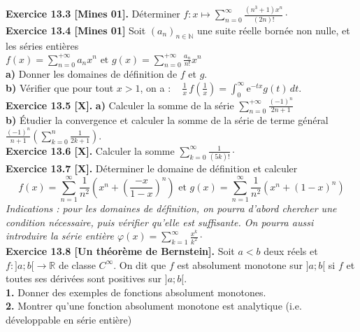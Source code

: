 \documentclass[a4paper,12pt,francais]{article}
\newcommand{\field}[1]{\mathbb{#1}}
\newcommand{\N}{\field{N}}
\newcommand{\R}{\field{R}}
\newcommand{\e}{\mbox{e}}
\begin{document}
\noindent
{\bf Exercice 13.3 [Mines 01].} Déterminer $\displaystyle f: x\mapsto
\sum_{n=0}^\infty \frac{(n^3+1)x^n}{(2n)!} \cdot$\\

\noindent
{\bf Exercice 13.4 [Mines 01]} Soit $(a_n)_{n\in \N}$ une suite réelle
bornée non nulle, et les séries entières \\
$\displaystyle f(x)=\sum_{n=0}^{+\infty} a_n x^n \mbox{ et }
 g(x)=\sum_{n=0}^{+\infty} \frac{a_n}{n!} x^n$\\
\indent
{\bf a)} Donner les domaines de définition de $f$ et $g$.\\
\indent
{\bf b)} Vérifier que pour tout $x>1$, on a :  
$\displaystyle
 \; \; \; \frac{1}{x}\, f\left(\frac{1}{x} \right) = \int_0^\infty \e^{-tx}
 g(t)\, dt.$\\

\noindent
{\bf Exercice 13.5 [X].}
{\bf a)} Calculer la somme de la série $\displaystyle
    \sum_{n=0}^{+\infty}\frac{(-1)^n}{2n+1}$\\
{\bf b)} \'Etudier la convergence et calculer la somme de la série de
terme général $\displaystyle \frac{(-1)^n}{n+1} \left({\sum_{k=0}^n \frac{1}{2k+1}
}\right)$.\\

\noindent
{\bf Exercice 13.6 [X].} Calculer la somme $\displaystyle
\sum_{k=0}^{\infty} \frac{1}{(5k)!}\cdot$\\

\noindent
{\bf Exercice 13.7 [X].} Déterminer le domaine de définition et calculer 
$$f(x)=\sum_{n=1}^{\infty} \frac{1}{n^2} \left({x^n+
\left({\frac{-x}{1-x}}\right)^n
}\right) \mbox{ et }
g(x)=\sum_{n=1}^{\infty} \frac{1}{n^2} \left({x^n+
(1-x)^n
}\right)$$
{\it Indications : pour les domaines de définition, on pourra d'abord
  chercher une condition nécessaire, puis vérifier qu'elle est
  suffisante. On pourra aussi introduire la série entière
  $\displaystyle \varphi(x)=\sum_{k=1}^\infty \frac{x^k}{k^2}\cdot$}\\

\noindent
{\bf Exercice 13.8 [Un théorème de Bernstein].} Soit $a<b$ deux réels et
$f:]a;b[ \rightarrow \R$ de classe $C^\infty$. On dit que
$f$ est absolument monotone sur $]a;b[$ si $f$ et toutes ses dérivées
  sont positives sur $]a;b[$.\\
{\bf 1.} Donner des exemples de fonctions absolument monotones.\\
{\bf 2.} Montrer qu'une fonction absolument monotone est analytique
(i.e. développable en série entière)\\
\end{document}
